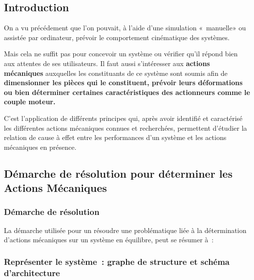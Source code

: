 \hypertarget{introduction}{%
\subsection{Introduction}\label{introduction}}

On a vu précédement que l'on pouvait, à l'aide d'une simulation «~manuelle» ou assistée par ordinateur, prévoir le comportement cinématique des systèmes.

Mais cela ne suffit pas pour concevoir un système ou vérifier qu'il répond bien aux attentes de ses utilisateurs. Il faut aussi s'intéresser aux \textbf{actions mécaniques} auxquelles les constituants de ce système sont soumis afin de \textbf{dimensionner les pièces qui le constituent, prévoir leurs déformations ou bien déterminer certaines caractéristiques des actionneurs comme le couple moteur.}

C'est l'application de différents principes qui, après avoir identifié et caractérisé les différentes actions mécaniques connues et recherchées, permettent d'étudier la relation de cause à effet entre les performances d'un système et les actions mécaniques en présence.

\hypertarget{duxe9marche-de-ruxe9solution-pour-duxe9terminer-les-actions-muxe9caniques}{%
\subsection{Démarche de résolution pour déterminer les Actions Mécaniques}\label{duxe9marche-de-ruxe9solution-pour-duxe9terminer-les-actions-muxe9caniques}}

\hypertarget{duxe9marche-de-ruxe9solution}{%
\subsubsection{Démarche de résolution}\label{duxe9marche-de-ruxe9solution}}

La démarche utilisée pour un résoudre une problématique liée à la détermination d'actions mécaniques sur un système en équilibre, peut se résumer à~:

\hypertarget{repruxe9senter-le-systuxe8me-graphe-de-structure-et-schuxe9ma-darchitecture}{%
\subsubsection{Représenter le système~: graphe de structure et schéma d'architecture}\label{repruxe9senter-le-systuxe8me-graphe-de-structure-et-schuxe9ma-darchitecture}}


